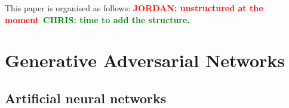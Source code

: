 \documentclass[12pt]{iopart}
\newcommand{\jordan}[1]{\textbf{\textcolor{red}{JORDAN: #1}}}
\newcommand{\chris}[1]{\textbf{\textcolor{green}{CHRIS: #1}}}
\begin{document}
%
This paper is organised as follows: \jordan{unstructured at the
moment}~\chris{time to add the structure.}

\section{Generative Adversarial Networks}

%
\subsection{Artificial neural networks}
\end{document}

